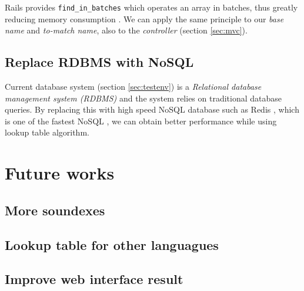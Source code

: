 Rails provides \texttt{find\_in\_batches} which operates an array in batches,
thus greatly reducing memory consumption \cite[]{fib}. We can apply
the same principle to our \emph{base name} and \emph{to-match name},
also to the \emph{controller} (section \ref{sec:mvc}).

\subsection{Replace RDBMS with NoSQL}

Current database system (section \ref{sec:testenv}) is a
\emph{Relational database management system (RDBMS)} \cite[]{rdbms} and the system
relies on traditional database queries. By replacing this with high speed
NoSQL database such as Redis \cite[]{redis}, which is one of the fastest
NoSQL \cite[]{redis2}, we can obtain better performance while using
lookup table algorithm.

\section{Future works}

\subsection{More soundexes}

\subsection{Lookup table for other languagues}

\subsection{Improve web interface result}

